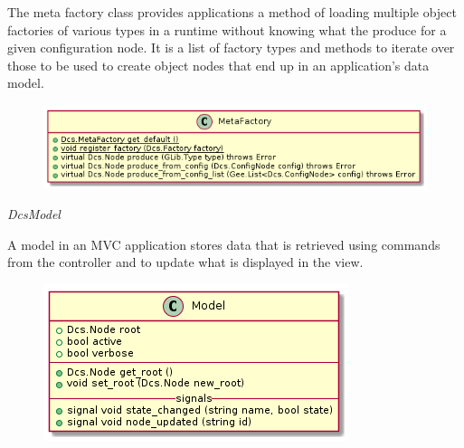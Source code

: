      \vspace*{-0.75cm}
      \begin{minipage}[t]{0.5\textwidth}
      	\vspace*{0.5cm}
        The meta factory class provides applications a method of loading
        multiple object factories of various types in a runtime without knowing
        what the produce for a given configuration node. It is a list of factory
        types and methods to iterate over those to be used to create object
        nodes that end up in an application's data model.
      \end{minipage} \hfill
      \begin{minipage}[t]{0.45\textwidth}
        \begin{figure}[H]
          \includegraphics[width=\textwidth]{figures/design/class/core/meta-factory}
          \label{fig:dsg-classes-meta-factory}
        \end{figure}
      \end{minipage}

      \emph{DcsModel}

      \vspace*{-0.75cm}
      \begin{minipage}[t]{0.5\textwidth}
      	\vspace*{0.5cm}
        A model in an MVC application stores data that is retrieved using
        commands from the controller and to update what is displayed in the
        view.
      \end{minipage} \hfill
      \begin{minipage}[t]{0.45\textwidth}
        \begin{figure}[H]
          \includegraphics[width=\textwidth]{figures/design/class/core/model}
          \label{fig:dsg-classes-model}
        \end{figure}
      \end{minipage}

